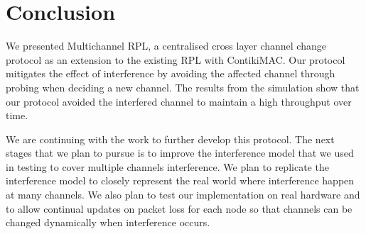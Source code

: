 \section{Conclusion}
\label{sec:conclusion}


We presented Multichannel RPL, a centralised cross layer channel change protocol as an extension to the existing RPL with ContikiMAC. Our protocol mitigates the effect of interference by avoiding the affected channel through probing when deciding a new channel. The results from the simulation show that our protocol avoided the interfered channel to maintain a high throughput over time. 

We are continuing with the work to further develop this protocol. The next stages that we plan to pursue is to improve the interference model that we used in testing to cover multiple channels interference. We plan to replicate the interference model to closely represent the real world where interference happen at many channels. We also plan to test our implementation on real hardware and to allow continual updates on packet loss for each node so that channels can be changed dynamically when interference occurs.


